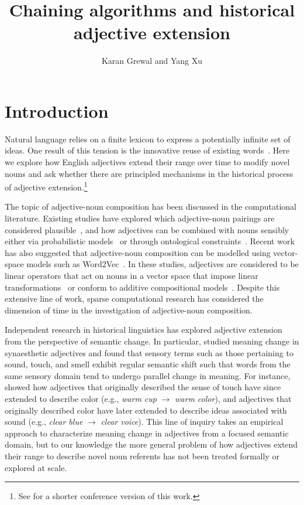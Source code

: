 \documentclass[output=paper]{langsci/langscibook}
\author{Karan Grewal\affiliation{University of Toronto} and Yang Xu\affiliation{University of Toronto}}
\title{Chaining algorithms and historical adjective extension}
\begin{document}
\maketitle


\section{Introduction}

Natural language relies on a finite lexicon to express a potentially infinite set of ideas. One result of this tension is the innovative reuse of existing words~\citep{ramiro2018}. Here we explore how English adjectives extend their range over time to modify novel nouns and ask whether there are principled mechanisms in the historical process of adjective extension.\footnote{See \citet{grewal2020chaining} for a shorter conference version of this work.}

The topic of adjective-noun composition has been discussed in the computational literature. Existing studies have explored which adjective-noun pairings are considered plausible~\citep{lapata1999}, and how adjectives can be combined with nouns sensibly either via probabilistic models~\citep{lapata2001} or through ontological constraints~\citep{schmidt2006}. Recent work has also suggested that adjective-noun composition can be modelled using vector-space models such as Word2Vec~\citep{mikolov2013-distributed}. In these studies, adjectives are considered to be linear operators that act on nouns in a vector space that impose linear transformations~\citep{baroni2010, boleda2013, vecchi2013, vecchi2017} or conform to additive compositional models~\citep{zanzotto2010}. Despite this extensive line of work, sparse computational research has considered the dimension of time in the investigation of adjective-noun composition.

Independent research in historical linguistics has explored adjective extension from the perspective of semantic change. In particular, \citet{williams1976} studied meaning change in synaesthetic adjectives and found that sensory terms such as those pertaining to sound, touch, and smell exhibit regular semantic shift such that words from the same sensory domain tend to undergo parallel change in meaning. For instance, \citet{williams1976} showed how adjectives that originally described the sense of touch have since extended to describe color (e.g., {\it warm cup} $\rightarrow$ {\it warm color}), and adjectives that originally described color have later extended to describe ideas associated with sound (e.g., {\it clear blue} $\rightarrow$ {\it clear voice}). This line of inquiry takes an empirical approach to characterize meaning change in adjectives from a focused semantic domain, but to our knowledge the more general problem of how adjectives extend their range to describe novel noun referents has not been treated formally or explored at scale.
\end{document}

